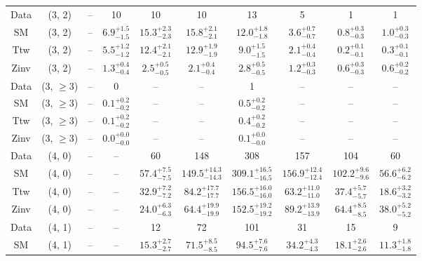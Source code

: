 \begin{table}[h!]
{\begin{tabular}{cccccccccc}
	Data & (3, 2) & -- & 10 & 10 & 10 & 13 & 5 & 1 & 1 \\[0.5ex] 
	SM & (3, 2) & -- & $6.9^{+ 1.5 }_{- 1.5 }$ & $15.3^{+ 2.3 }_{- 2.3 }$ & $15.8^{+ 2.1 }_{- 2.1 }$ & $12.0^{+ 1.8 }_{- 1.8 }$ & $3.6^{+ 0.7 }_{- 0.7 }$ & $0.8^{+ 0.3 }_{- 0.3 }$ & $1.0^{+ 0.3 }_{- 0.3 }$ \\[0.5ex] 
	Ttw & (3, 2) & -- & $5.5^{+ 1.2 }_{- 1.2 }$ & $12.4^{+ 2.1 }_{- 2.1 }$ & $12.9^{+ 1.9 }_{- 1.9 }$ & $9.0^{+ 1.5 }_{- 1.5 }$ & $2.1^{+ 0.4 }_{- 0.4 }$ & $0.2^{+ 0.1 }_{- 0.1 }$ & $0.3^{+ 0.1 }_{- 0.1 }$ \\[0.5ex] 
	Zinv & (3, 2) & -- & $1.3^{+ 0.4 }_{- 0.4 }$ & $2.5^{+ 0.5 }_{- 0.5 }$ & $2.1^{+ 0.4 }_{- 0.4 }$ & $2.8^{+ 0.5 }_{- 0.5 }$ & $1.2^{+ 0.3 }_{- 0.3 }$ & $0.6^{+ 0.3 }_{- 0.3 }$ & $0.6^{+ 0.2 }_{- 0.2 }$ \\[0.5ex] 
	Data & (3, $\ge3$) & -- & 0 & -- & -- & 1 & -- & -- & -- \\[0.5ex] 
	SM & (3, $\ge3$) & -- & $0.1^{+ 0.2 }_{- 0.2 }$ & -- & -- & $0.5^{+ 0.2 }_{- 0.2 }$ & -- & -- & -- \\[0.5ex] 
	Ttw & (3, $\ge3$) & -- & $0.1^{+ 0.2 }_{- 0.2 }$ & -- & -- & $0.4^{+ 0.2 }_{- 0.2 }$ & -- & -- & -- \\[0.5ex] 
	Zinv & (3, $\ge3$) & -- & $0.0^{+ 0.0 }_{- 0.0 }$ & -- & -- & $0.1^{+ 0.0 }_{- 0.0 }$ & -- & -- & -- \\[0.5ex] 
	Data & (4, 0) & -- & -- & 60 & 148 & 308 & 157 & 104 & 60 \\[0.5ex] 
	SM & (4, 0) & -- & -- & $57.4^{+ 7.5 }_{- 7.5 }$ & $149.5^{+ 14.3 }_{- 14.3 }$ & $309.1^{+ 16.5 }_{- 16.5 }$ & $156.9^{+ 12.4 }_{- 12.4 }$ & $102.2^{+ 9.6 }_{- 9.6 }$ & $56.6^{+ 6.2 }_{- 6.2 }$ \\[0.5ex] 
	Ttw & (4, 0) & -- & -- & $32.9^{+ 7.2 }_{- 7.2 }$ & $84.2^{+ 17.7 }_{- 17.7 }$ & $156.5^{+ 16.0 }_{- 16.0 }$ & $63.2^{+ 11.0 }_{- 11.0 }$ & $37.4^{+ 5.7 }_{- 5.7 }$ & $18.6^{+ 3.2 }_{- 3.2 }$ \\[0.5ex] 
	Zinv & (4, 0) & -- & -- & $24.0^{+ 6.3 }_{- 6.3 }$ & $64.4^{+ 19.9 }_{- 19.9 }$ & $152.5^{+ 19.2 }_{- 19.2 }$ & $89.2^{+ 13.9 }_{- 13.9 }$ & $64.4^{+ 8.5 }_{- 8.5 }$ & $38.0^{+ 5.2 }_{- 5.2 }$ \\[0.5ex] 
	Data & (4, 1) & -- & -- & 12 & 72 & 101 & 31 & 15 & 9 \\[0.5ex] 
	SM & (4, 1) & -- & -- & $15.3^{+ 2.7 }_{- 2.7 }$ & $71.5^{+ 8.5 }_{- 8.5 }$ & $94.5^{+ 7.6 }_{- 7.6 }$ & $34.2^{+ 4.3 }_{- 4.3 }$ & $18.1^{+ 2.6 }_{- 2.6 }$ & $11.3^{+ 1.8 }_{- 1.8 }$ \\[0.5ex] 

\end{tabular}}
\end{table}
